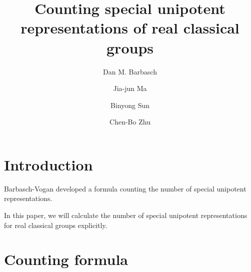 \documentclass[12pt,a4paper]{amsart}
\numberwithin{equation}{section}
\theoremstyle{remark}
\begin{document}
\title[]{Counting special unipotent representations of real classical groups}

\author [D. Barbasch] {Dan M. Barbasch}
\address{the Department of Mathematics\\
  310 Malott Hall, Cornell University, Ithaca, New York 14853 }

\author [J.-J. Ma] {Jia-jun Ma}
\address{School of Mathematical Sciences\\
  Shanghai Jiao Tong University\\
  800 Dongchuan Road, Shanghai, 200240, China} 

\author [B. Sun] {Binyong Sun}
\address{Academy of Mathematics and Systems Science\\
  Chinese Academy of Sciences\\
  Beijing, 100190, China} 

\author [C.-B. Zhu] {Chen-Bo Zhu}
\address{Department of Mathematics\\
  National University of Singapore\\
  10 Lower Kent Ridge Road, Singapore 119076} 




 

\maketitle


\tableofcontents
\section{Introduction}

%

Barbasch-Vogan \cite{BVUni,BV.W} developed a formula  counting the number of
special unipotent representations.

In this paper, we will calculate the number of special unipotent representations
for real classical groups explicitly.


\section{Counting formula}
\end{document}
